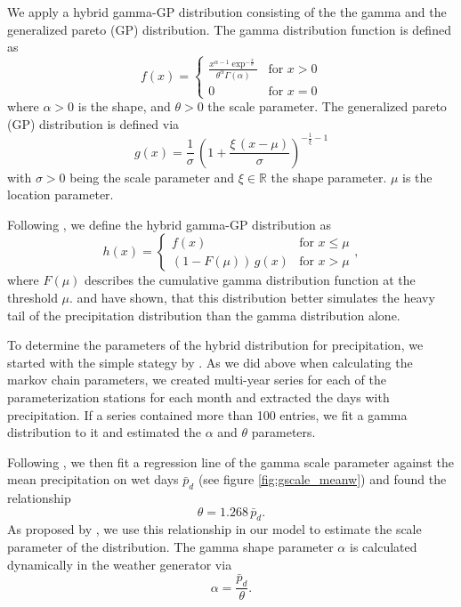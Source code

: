 \begin{refsection}
We apply a hybrid gamma-GP distribution consisting of the the gamma and the generalized pareto (GP) distribution. The gamma distribution function is defined as
\begin{equation}
f(x) = \begin{cases}
\frac{x^{\alpha - 1}\exp^{-\frac{x}{\theta}}}{\theta^{\alpha} \Gamma(\alpha)} & \text{for } x > 0 \\
0 & \text{for } x = 0
\end{cases} \label{eq:gamma}
\end{equation}
where $\alpha > 0$ is the shape, and $\theta > 0$ the scale parameter.
The generalized pareto (GP) distribution is defined via
\begin{equation}
g(x) = \frac{1}{\sigma}\, \left( 1 + \frac{\xi\,\left(x - \mu\right)}{\sigma}\right)^{-\frac{1}{\xi} - 1} \label{eq:GP}
\end{equation}
with $\sigma > 0$ being the scale parameter and $\xi \in \mathbb{R}$ the shape parameter. $\mu$ is the location parameter.

Following \cite{FurrerKatz2008}, we define the hybrid gamma-GP distribution as
\begin{equation}
h(x) = \begin{cases}
f(x) & \text{for } x \leq \mu \\
(1 - F(\mu))\,g(x) & \text{for }  x > \mu
\end{cases}, \label{eq:GammaGP}
\end{equation}
where $F(\mu)$ describes the cumulative gamma distribution function at the threshold $\mu$. \cite{FurrerKatz2008} and \cite{NeykovNeytchevZucchini2014} have shown, that this distribution better simulates the heavy tail of the precipitation distribution than the gamma distribution alone.

To determine the parameters of the hybrid distribution for precipitation, we started with the simple stategy by \cite{GengDevriesSupit1986}. As we did above when calculating the markov chain parameters, we created multi-year series for each of the parameterization stations for each month and extracted the days with precipitation. If a series contained more than 100 entries, we fit a gamma distribution to it and estimated the $\alpha$ and $\theta$ parameters.

Following \cite{GengDevriesSupit1986}, we then fit a regression line of the gamma scale parameter against the mean precipitation on wet days $\bar{p}_d$ (see figure \ref{fig:gscale_meanw}) and found the relationship
\begin{equation}
\theta = 1.268\, \bar{p}_d. \label{eq:gamma_scale}
\end{equation}
As proposed by \cite{GengDevriesSupit1986}, we use this relationship in our model to estimate the scale parameter of the distribution. The gamma shape parameter $\alpha$ is calculated dynamically in the weather generator via
\begin{equation}
\alpha = \frac{\bar{p}_d}{\theta}. \label{eq:gamma_shape}
\end{equation}


\end{refsection}
